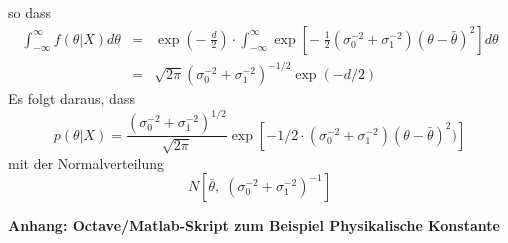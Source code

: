 so dass
\begin{equation}
\begin{array}{rcl}
\int_{-\infty}^{\infty} f(\theta|X) d \theta & = & 
\exp \left( -\; \frac{d}{2} \right) \cdot \int_{-\infty}^{\infty} 
\exp \left[ - \; \frac{1}{2} (\sigma_0^{-2}+ \sigma_1^{-2})(\theta - \bar{\theta})^2
\right] d \theta \\
&=& \sqrt{2 \pi} (\sigma_0^{-2}+\sigma_1^{-2})^{-1/2} \exp (-d/2) 
\end{array}
\end{equation}
Es folgt daraus, dass 
\begin{equation}
p(\theta|X) = \frac{(\sigma_0^{-2}+\sigma_1^{-2})^{1/2}}{\sqrt{2\pi}}
\exp \left[- 1/2 \cdot (\sigma_0^{-2}+\sigma_1^{-2})(\theta-\bar{\theta})^2)\right]
\end{equation}
mit der Normalverteilung
\begin{equation}
N\left[\bar{\theta}, \; (\sigma_0^{-2} + \sigma_1^{-2})^{-1} \right]
\end{equation}

\textbf{Anhang: Octave/Matlab-Skript zum Beispiel \glqq Physikalische Konstante\grqq}

